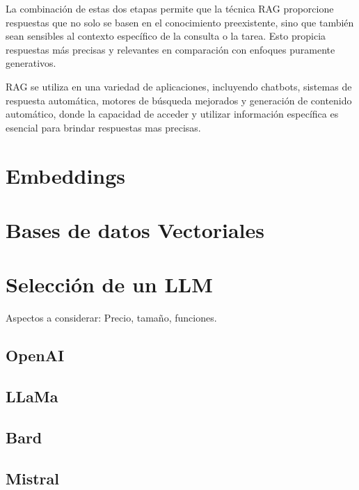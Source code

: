 La combinación de estas dos etapas permite que la técnica RAG proporcione respuestas que no solo se basen en el conocimiento preexistente\cite{chen-etal-2017-reading}, sino que también sean sensibles al contexto específico de la consulta o la tarea. Esto propicia respuestas más precisas y relevantes en comparación con enfoques puramente generativos\cite{fan-etal-2019-eli5,hossain-etal-2020-simple}.

RAG se utiliza en una variedad de aplicaciones, incluyendo chatbots, sistemas de respuesta automática, motores de búsqueda mejorados y generación de contenido automático, donde la capacidad de acceder y utilizar información específica es esencial para brindar respuestas mas precisas.

\section{Embeddings}

\section{Bases de datos Vectoriales}

\section{Selección de un LLM}

Aspectos a considerar: Precio, tamaño, funciones.

\subsection{OpenAI}


\subsection{LLaMa}

\cite{Murtuza}


\subsection{Bard}

\subsection{Mistral}

